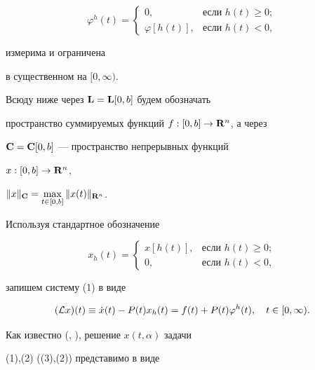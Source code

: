 $$


{\varphi}^h(t)=


\begin{cases}


0, & \text{если } h(t){\ge}0;\\


{\varphi}[h(t)], & \text{если } h(t)<0,


\end{cases}


$$


измерима и ограничена


в существенном на $[0,{\infty})$.





Всюду ниже через ${\bold L}={\bold L}[0,b]$ будем обозначать


пространство суммируемых функций $f:[0,b]\to {{\bold R}^n}$, а через


${\bold C}={\bold C}[0,b]$ --- пространство непрерывных функций


$x:[0,b]\to {{\bold R}^n}$,


$\|x\|_{\bold C}=\max


\limits_{t\in[0,b]} \|x(t)\|_{{\bold R}^n}$.





Используя стандартное обозначение \cite{1}


$$


x_h(t)=


\begin{cases}


x[h(t)], & \text{если } h(t){\ge}0;\\


0, & \text{если } h(t)<0,


\end{cases}


$$


запишем систему (1) в виде


\begin{equation}


({\cal L}x)(t)\equiv{\Dot x}(t)-P(t)x_h(t)=f(t)+P(t){\varphi}^h(t),


\quad


t\in [0,{\infty}).


\end{equation}


Как известно (\cite{1}, \cite{2}), решение $x(t,{\alpha})$ задачи


(1),\;(2) ((3),\;(2)) представимо в виде


